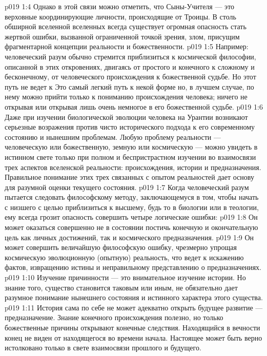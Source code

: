 \vs p019 1:4 Однако в этой связи можно отметить, что Сыны\hyp{}Учителя --- это верховные координирующие личности, происходящие от Троицы. В столь обширной вселенной вселенных всегда существует огромная опасность стать жертвой ошибки, вызванной ограниченной точкой зрения, злом, присущим фрагментарной концепции реальности и божественности.
\vs p019 1:5 Например: человеческий разум обычно стремится приблизиться к космической философии, описанной в этих откровениях, двигаясь от простого и конечного к сложному и бесконечному, от человеческого происхождения к божественной судьбе. Но этот путь не ведет к  Это самый легкий путь к некой форме  но, в лучшем случае, по нему можно прийти только к пониманию происхождения человека; ничего не открывая или открывая лишь очень немногое в его божественной судьбе.
\vs p019 1:6 Даже при изучении биологической эволюции человека на Урантии возникают серьезные возражения против чисто исторического подхода к его современному состоянию и нынешним проблемам. Любую проблему реальности --- человеческую или божественную, земную или космическую --- можно увидеть в истинном свете только при полном и беспристрастном изучении во взаимосвязи трех аспектов вселенской реальности: происхождения, истории и предназначения. Правильное понимание этих трех связанных с опытом реальностей дает основу для разумной оценки текущего состояния.
\vs p019 1:7 \pc Когда человеческий разум пытается следовать философскому методу, заключающемуся в том, чтобы начать с низшего с целью приблизиться к высшему, будь то в биологии или в теологии, ему всегда грозит опасность совершить четыре логические ошибки:
\vs p019 1:8 \bibnobreakspace Он может оказаться совершенно не в состоянии постичь конечную и окончательную цель как личных достижений, так и космического предназначения.
\vs p019 1:9 \bibnobreakspace Он может совершить величайшую философскую ошибку, чрезмерно упрощая космическую эволюционную (опытную) реальность, что ведет к искажению фактов, извращению истины и неправильному представлению о предназначениях.
\vs p019 1:10 \bibnobreakspace Изучение причинности --- это внимательное изучение истории. Но знание того,  существо становится таковым или иным, не обязательно дает разумное понимание нынешнего состояния и истинного характера этого существа.
\vs p019 1:11 \bibnobreakspace История сама по себе не может адекватно открыть будущее развитие --- предназначение. Знание конечного происхождения полезно, но только божественные причины открывают конечные следствия. Находящийся в вечности конец не виден от находящегося во времени начала. Настоящее может быть верно истолковано только в свете взаимосвязи прошлого и будущего.
